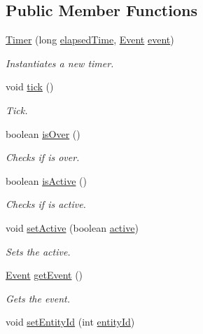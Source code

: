 \subsection*{Public Member Functions}
\begin{DoxyCompactItemize}
\item 
\hyperlink{classbr_1_1unb_1_1unbomber_1_1component_1_1_timer_a8b7a436f14fc18015f1051e6335f4a25}{Timer} (long \hyperlink{classbr_1_1unb_1_1unbomber_1_1component_1_1_timer_ac50112dc7d20272d80c32d32019e9b9a}{elapsed\+Time}, \hyperlink{classbr_1_1unb_1_1unbomber_1_1core_1_1_event}{Event} \hyperlink{classbr_1_1unb_1_1unbomber_1_1component_1_1_timer_afb03bb22d0faae22c10461086fa9486e}{event})
\begin{DoxyCompactList}\small\item\em Instantiates a new timer. \end{DoxyCompactList}\item 
void \hyperlink{classbr_1_1unb_1_1unbomber_1_1component_1_1_timer_a1d1db578ecf8f0a785a58d2c56ed3e97}{tick} ()
\begin{DoxyCompactList}\small\item\em Tick. \end{DoxyCompactList}\item 
boolean \hyperlink{classbr_1_1unb_1_1unbomber_1_1component_1_1_timer_aef2afadc30b76c3359bf615c75889079}{is\+Over} ()
\begin{DoxyCompactList}\small\item\em Checks if is over. \end{DoxyCompactList}\item 
boolean \hyperlink{classbr_1_1unb_1_1unbomber_1_1component_1_1_timer_a741e5c972185dc83625b840b30c3d05c}{is\+Active} ()
\begin{DoxyCompactList}\small\item\em Checks if is active. \end{DoxyCompactList}\item 
void \hyperlink{classbr_1_1unb_1_1unbomber_1_1component_1_1_timer_a39aaaaa59736b4744cb3c064795826ba}{set\+Active} (boolean \hyperlink{classbr_1_1unb_1_1unbomber_1_1component_1_1_timer_a8e0a7bdef47826d7af3e4d10b839a02b}{active})
\begin{DoxyCompactList}\small\item\em Sets the active. \end{DoxyCompactList}\item 
\hyperlink{classbr_1_1unb_1_1unbomber_1_1core_1_1_event}{Event} \hyperlink{classbr_1_1unb_1_1unbomber_1_1component_1_1_timer_aacfd2ff448d543c394cd165dcb33f118}{get\+Event} ()
\begin{DoxyCompactList}\small\item\em Gets the event. \end{DoxyCompactList}\item 
void \hyperlink{classbr_1_1unb_1_1unbomber_1_1component_1_1_timer_af3ac14e5b78a1595782fa73b34820954}{set\+Entity\+Id} (int \hyperlink{classbr_1_1unb_1_1unbomber_1_1core_1_1_component_a3eff11219571ba1890651e922b9879ef}{entity\+Id})
\end{DoxyCompactItemize}
